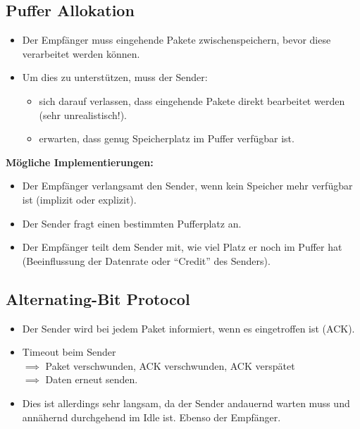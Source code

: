         \subsection{Puffer Allokation}
            \begin{itemize}
            	\item Der Empfänger muss eingehende Pakete zwischenspeichern, bevor diese verarbeitet werden können.
            	\item Um dies zu unterstützen, muss der Sender:
                	\begin{itemize}
                		\item sich darauf verlassen, dass eingehende Pakete direkt bearbeitet werden (sehr unrealistisch!).
                		\item erwarten, dass genug Speicherplatz im Puffer verfügbar ist.
                	\end{itemize}
            \end{itemize}
            
            \textbf{Mögliche Implementierungen:}
            \begin{itemize}
            	\item Der Empfänger verlangsamt den Sender, wenn kein Speicher mehr verfügbar ist (implizit oder explizit).
            	\item Der Sender fragt einen bestimmten Pufferplatz an.
            	\item Der Empfänger teilt dem Sender mit, wie viel Platz er noch im Puffer hat (Beeinflussung der Datenrate oder \enquote{Credit} des Senders).
            \end{itemize}

        \subsection{Alternating-Bit Protocol}
            \label{sec:abp}
        
            \begin{itemize}
            	\item Der Sender wird bei jedem Paket informiert, wenn es eingetroffen ist (ACK).
            	\item Timeout beim Sender \\ \(\implies\) Paket verschwunden, ACK verschwunden, ACK verspätet \\ \(\implies\) Daten erneut senden.
            	\item Dies ist allerdings sehr langsam, da der Sender andauernd warten muss und annähernd durchgehend im Idle ist. Ebenso der Empfänger.
            \end{itemize}

